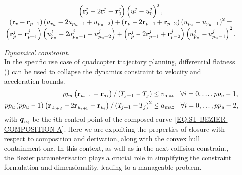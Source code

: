 \begin{itemize}
\begin{equation*}
\begin{matrix}
\begin{matrix}
                \left( \mathbf{r}_2^j - 2\mathbf{r}_1^j + \mathbf{r}_0^j \right) \left( u_1^j - u_0^j \right)^2,
            \end{matrix} \\
            \begin{matrix}
                \left( \mathbf{r}_{p} - \mathbf{r}_{p-1} \right) \left( u_{p_{u}} - 2u_{p_{u}-1} + u_{p_{u}-2} \right) +
                \left( \mathbf{r}_{p} - 2\mathbf{r}_{p-1} + \mathbf{r}_{p-2} \right) \left( u_{p_{u}} - u_{p_{u}-1} \right)^2 = \\
                \left( \mathbf{r}_{p}^j - \mathbf{r}_{p-1}^j \right) \left( u_{p_{u}}^j - 2u_{p_{u}-1}^j + u_{p_{u}-2}^j \right) +
                \left( \mathbf{r}_{p}^j - 2\mathbf{r}_{p-1}^j + \mathbf{r}_{p-2}^j \right) \left( u_{p_{u}}^j - u_{p_{u}-1}^j \right)^2.
            \end{matrix}
        \end{matrix}
    \end{equation*}

    \item[\emph{Dynamical}]\emph{constraint}.\\
    In the specific use case of quadcopter trajectory planning, differential flatness () can be used to collapse
    the dynamics constraint to velocity and acceleration bounds.
    \begin{equation*}
        \begin{split}
            p p_{u} \left( \mathbf{r}_{u_{i+1}} - \mathbf{r}_{u_{i}} \right) / \left( T_{j+1} - T_j \right) & \le v_{\text{max}} \hspace{0.3cm} \forall i = 0, \dots, p p_{u}-1, \\
            p p_{u} \left( p p_{u} - 1 \right) \left( \mathbf{r}_{u_{i+2}} - 2\mathbf{r}_{u_{i+1}} + \mathbf{r}_{u_{i}} \right) / \left( T_{j+1} - T_j \right)^2 & \le a_{\text{max}} \hspace{0.3cm} \forall i = 0, \dots, p p_{u}-2,
        \end{split}
    \end{equation*}
    with $\boldsymbol{q}_{u_{i}}$ be the $i$th control point of the composed curve~\eqref{EQ:ST-BEZIER-COMPOSITION-A}.
    Here we are exploiting the properties of closure with respect to composition and derivation, along with the convex hull containment one.
    In this context, as well as in the next collision constraint, the B\acuteacc ezier parameterisation plays a crucial role in
    simplifying the constraint formulation and dimensionality, leading to a manageable problem.


\end{itemize}
